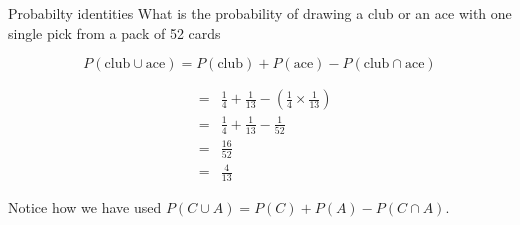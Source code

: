 \documentclass[10pt,a4paper,titlepage,twoside,openright]{report}
\begin{document}
\begin{wex}{Probabilty identities}
{What is the probability of drawing a club or an ace with one single pick from a pack of 52 cards}
{
$$P(\mbox{club} \cup \mbox{ace}) = P(\mbox{club}) + P(\mbox{ace}) - P(\mbox{club} \cap \mbox{ace})$$

\begin{eqnarray*}
&=&\frac{1}{4} + \frac{1}{13} - \left(\frac{1}{4}\times\frac{1}{13}\right)\\
&=&\frac{1}{4} + \frac{1}{13} - \frac{1}{52}\\
&=&\frac{16}{52}\\
&=&\frac{4}{13}
\end{eqnarray*}

Notice how we have used $P(C \cup A) = P(C) + P(A) - P(C\cap A)$.
}
\end{wex}
\end{document}
